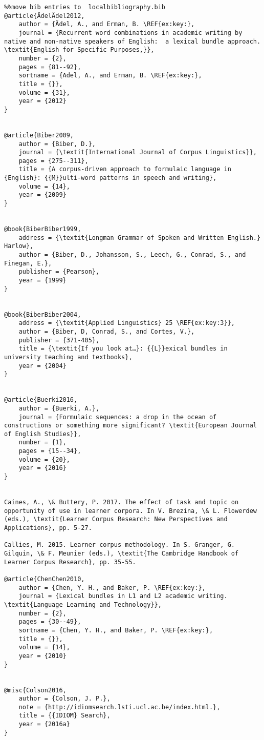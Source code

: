 \begin{verbatim}%%move bib entries to  localbibliography.bib
@article{ÄdelÄdel2012,
	author = {Ädel, A., and Erman, B. \REF{ex:key:},
	journal = {Recurrent word combinations in academic writing by native and non-native speakers of English:  a lexical bundle approach. \textit{English for Specific Purposes,}},
	number = {2},
	pages = {81--92},
	sortname = {Adel, A., and Erman, B. \REF{ex:key:},
	title = {}},
	volume = {31},
	year = {2012}
}


@article{Biber2009,
	author = {Biber, D.},
	journal = {\textit{International Journal of Corpus Linguistics}},
	pages = {275--311},
	title = {A corpus-driven approach to formulaic language in {English}: {{M}}ulti-word patterns in speech and writing},
	volume = {14},
	year = {2009}
}


@book{BiberBiber1999,
	address = {\textit{Longman Grammar of Spoken and Written English.} Harlow},
	author = {Biber, D., Johansson, S., Leech, G., Conrad, S., and Finegan, E.},
	publisher = {Pearson},
	year = {1999}
}


@book{BiberBiber2004,
	address = {\textit{Applied Linguistics} 25 \REF{ex:key:3}},
	author = {Biber, D, Conrad, S., and Cortes, V.},
	publisher = {371-405},
	title = {\textit{If you look at…}: {{L}}exical bundles in university teaching and textbooks},
	year = {2004}
}


@article{Buerki2016,
	author = {Buerki, A.},
	journal = {Formulaic sequences: a drop in the ocean of constructions or something more significant? \textit{European Journal of English Studies}},
	number = {1},
	pages = {15--34},
	volume = {20},
	year = {2016}
}


Caines, A., \& Buttery, P. 2017. The effect of task and topic on opportunity of use in learner corpora. In V. Brezina, \& L. Flowerdew (eds.), \textit{Learner Corpus Research: New Perspectives and Applications}, pp. 5-27.

Callies, M. 2015. Learner corpus methodology. In S. Granger, G. Gilquin, \& F. Meunier (eds.), \textit{The Cambridge Handbook of Learner Corpus Research}, pp. 35-55.

@article{ChenChen2010,
	author = {Chen, Y. H., and Baker, P. \REF{ex:key:},
	journal = {Lexical bundles in L1 and L2 academic writing. \textit{Language Learning and Technology}},
	number = {2},
	pages = {30--49},
	sortname = {Chen, Y. H., and Baker, P. \REF{ex:key:},
	title = {}},
	volume = {14},
	year = {2010}
}


@misc{Colson2016,
	author = {Colson, J. P.},
	note = {http://idiomsearch.lsti.ucl.ac.be/index.html.},
	title = {{IDIOM} Search},
	year = {2016a}
}



\end{verbatim}

